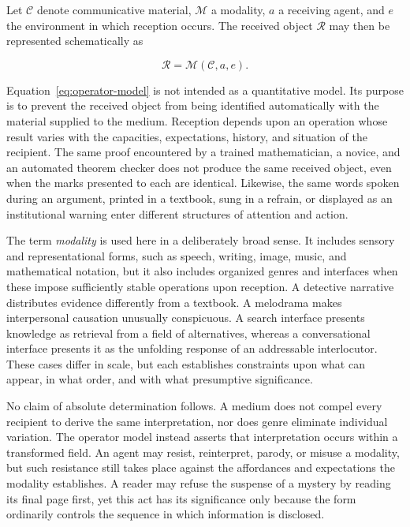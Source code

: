 \documentclass[11pt]{article}
\newcommand{\term}[1]{\emph{#1}}
\newcommand{\modality}{\mathcal{M}}
\newcommand{\contentobj}{\mathcal{C}}
\newcommand{\receivedobj}{\mathcal{R}}
\begin{document}
Let \(\contentobj\) denote communicative material, \(\modality\) a modality,
\(a\) a receiving agent, and \(e\) the environment in which reception occurs.
The received object \(\receivedobj\) may then be represented schematically as

\begin{equation}
  \receivedobj = \modality(\contentobj,a,e).
  \label{eq:operator-model}
\end{equation}

Equation~\ref{eq:operator-model} is not intended as a quantitative model. Its
purpose is to prevent the received object from being identified automatically
with the material supplied to the medium. Reception depends upon an operation
whose result varies with the capacities, expectations, history, and situation
of the recipient. The same proof encountered by a trained mathematician, a
novice, and an automated theorem checker does not produce the same received
object, even when the marks presented to each are identical. Likewise, the
same words spoken during an argument, printed in a textbook, sung in a refrain,
or displayed as an institutional warning enter different structures of
attention and action.

The term \term{modality} is used here in a deliberately broad sense. It
includes sensory and representational forms, such as speech, writing, image,
music, and mathematical notation, but it also includes organized genres and
interfaces when these impose sufficiently stable operations upon reception.
A detective narrative distributes evidence differently from a textbook. A
melodrama makes interpersonal causation unusually conspicuous. A search
interface presents knowledge as retrieval from a field of alternatives,
whereas a conversational interface presents it as the unfolding response of
an addressable interlocutor. These cases differ in scale, but each establishes
constraints upon what can appear, in what order, and with what presumptive
significance.

No claim of absolute determination follows. A medium does not compel every
recipient to derive the same interpretation, nor does genre eliminate
individual variation. The operator model instead asserts that interpretation
occurs within a transformed field. An agent may resist, reinterpret, parody,
or misuse a modality, but such resistance still takes place against the
affordances and expectations the modality establishes. A reader may refuse
the suspense of a mystery by reading its final page first, yet this act has
its significance only because the form ordinarily controls the sequence in
which information is disclosed.
\end{document}
